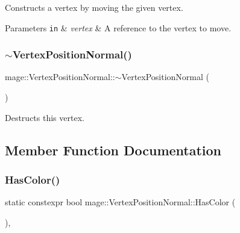 Constructs a vertex by moving the given vertex.


\begin{DoxyParams}[1]{Parameters}
\mbox{\tt in}  & {\em vertex} & A reference to the vertex to move. \\
\hline
\end{DoxyParams}
\hypertarget{structmage_1_1_vertex_position_normal_a664123217b7e8d18769ea46fc318e0c1}{}\label{structmage_1_1_vertex_position_normal_a664123217b7e8d18769ea46fc318e0c1} 
\subsubsection{\texorpdfstring{$\sim$\+Vertex\+Position\+Normal()}{~VertexPositionNormal()}}
{\footnotesize\ttfamily mage\+::\+Vertex\+Position\+Normal\+::$\sim$\+Vertex\+Position\+Normal (\begin{DoxyParamCaption}{ }\end{DoxyParamCaption})\hspace{0.3cm}{\ttfamily [default]}}

Destructs this vertex. 

\subsection{Member Function Documentation}
\hypertarget{structmage_1_1_vertex_position_normal_a6bd96547f8a39dd0fa0ecd2b478f7213}{}\label{structmage_1_1_vertex_position_normal_a6bd96547f8a39dd0fa0ecd2b478f7213} 
\subsubsection{\texorpdfstring{Has\+Color()}{HasColor()}}
{\footnotesize\ttfamily static constexpr bool mage\+::\+Vertex\+Position\+Normal\+::\+Has\+Color (\begin{DoxyParamCaption}{ }\end{DoxyParamCaption})\hspace{0.3cm}{\ttfamily [static]}, {\ttfamily [noexcept]}}


